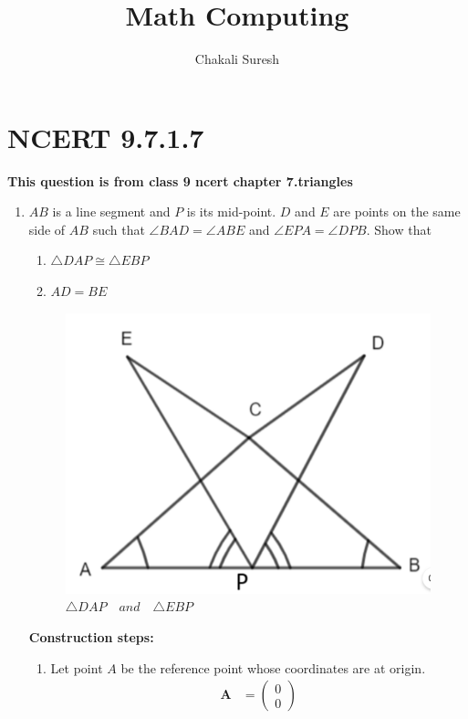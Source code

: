 \documentclass[11pt, a4paper]{article}
\title{ \textbf{Math Computing}}
\author{ Chakali Suresh }
\date{}
\newcommand{\myvec}[1]{\ensuremath{\begin{pmatrix}#1\end{pmatrix}}}
\let\vec\mathbf
\begin{document}
\vspace{-\baselineskip}
\maketitle

\section*{NCERT 9.7.1.7}

\textbf{This question is from class 9 ncert chapter 7.triangles}
\begin{enumerate}
	\item $AB$ is a line segment and $P$ is its mid-point. $D$ and $E$ are points on the same side of $AB$ such that $\angle BAD = \angle ABE$ and $\angle EPA = \angle DPB$. Show that
		\begin{enumerate}
	\item $\triangle DAP \cong  \triangle EBP$
	\item $AD = BE$
\end{enumerate}
\begin{figure}[H]
    \includegraphics[width=\columnwidth]{figs/mc.png}
    \caption{$\triangle  DAP \hspace{12pt} and \hspace{12pt} \triangle EBP$}
 \label{fig:fig1}
\end{figure}
\pagebreak
\textbf{Construction steps:}
\\
		\begin{enumerate}[label=(\roman*)]
\item Let point $A$ be the reference point whose coordinates are at origin. 
\begin{align}
\vec{A} &= \myvec{0 \\ 0}
\end{align}


\end{enumerate}
\end{enumerate}
\end{document}
